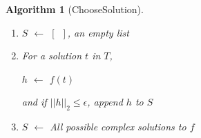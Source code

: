 \documentclass{article}%
\newtheorem{algorithm}[theorem]{Algorithm}
\begin{document}
\begin{algorithm}
[ChooseSolution]
\phantom{L}
\begin{enumerate}
    \item $S$ $\leftarrow$ $[\phantom{0}]$, an empty list

    \item For a solution $t$ in $T$,

    $h$ $\leftarrow$ $f(t)$

    and if $||h||_2\leq\epsilon$, append $h$ to $S$

    \item $S$ $\leftarrow$ All possible complex solutions to $f$
\end{enumerate}
\end{algorithm}
\end{document}

